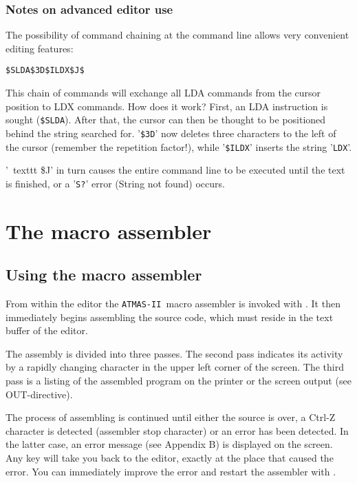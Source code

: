 \documentclass[10pt,a4paper,twoside,final,openright,titlepage]{memoir}
\def\atmas{\texttt{AT\-MAS-II }}
\newcommand{\key}[1]{\keystroke{\tiny #1}}
\begin{document}
\subsection{Notes on advanced editor use}

The possibility of command chaining at the command line allows very convenient editing features:

\par
\bigskip
	\texttt{\$SLDA\$3D\$ILDX\$J\$}\key{ESC}
\par
\bigskip

This chain of commands will exchange all LDA commands from the cursor position to LDX commands. How does it work?
First, an LDA instruction is sought (\texttt{\$SLDA}). After that, the cursor can then be thought to be positioned behind the string searched for.
'\texttt{\$3D}' now deletes three characters to the left of the cursor (remember the
repetition factor!), while '\texttt{\$ILDX}' inserts the string '\texttt{LDX}'.

'\ texttt {\$J}' in turn causes the entire command line to be executed until the text is finished, or a '\texttt{S?}'
error (String not found) occurs.

\chapter{The macro assembler}

\section{Using the macro assembler}

From within the editor the \atmas macro assembler is invoked with \key{CTRL-Y}.
It then immediately begins assembling the source code, which must reside in the text buffer of the editor.

The assembly is divided into three passes. The second pass indicates its activity by a rapidly changing
character in the upper left corner of the screen.
The third pass is a listing of the assembled program on the printer or the screen output (see OUT-directive).


The process of assembling is continued until either the source is over,
a Ctrl-Z character is detected (assembler stop character) or an error has been detected.
In the latter case, an error message (see Appendix B) is displayed on the screen.
Any key will take you back to the editor, exactly at the place that caused the error.
You can immediately improve the error and restart the assembler with \key{CTRL-Y}.
\end{document}
